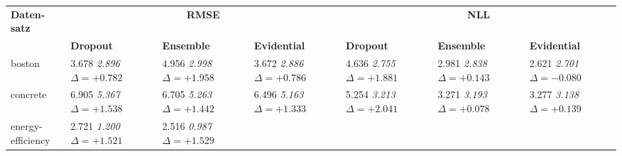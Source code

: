\begin{otherlanguage}{ngerman}
\begin{table*}[!htbp]
\centering
\scriptsize
\begin{tabularx}{\textwidth}{|l|X|X|X|X|X|X|}
\hline
\multirow{}{}{\textbf{Datensatz}} 
& \multicolumn{3}{c|}{\textbf{RMSE}} 
& \multicolumn{3}{c|}{\textbf{NLL}} \\ \cline{2-7}
& \textbf{Dropout} & \textbf{Ensemble} & \textbf{Evidential} 
& \textbf{Dropout} & \textbf{Ensemble} & \textbf{Evidential} \\ \hline
boston 
& 3.678 \newline \textit{2.896} \newline \mbox{$\Delta=+0.782$} 
& 4.956 \newline \textit{2.998} \newline \mbox{$\Delta=+1.958$} 
& 3.672 \newline \textit{2.886} \newline \mbox{$\Delta=+0.786$} 
& 4.636 \newline \textit{2.755} \newline \mbox{$\Delta=+1.881$} 
& 2.981 \newline \textit{2.838} \newline \mbox{$\Delta=+0.143$} 
& 2.621 \newline \textit{2.701} \newline \mbox{$\Delta=-0.080$} \\ \hline
concrete 
& 6.905 \newline \textit{5.367} \newline \mbox{$\Delta=+1.538$} 
& 6.705 \newline \textit{5.263} \newline \mbox{$\Delta=+1.442$} 
& 6.496 \newline \textit{5.163} \newline \mbox{$\Delta=+1.333$} 
& 5.254 \newline \textit{3.213} \newline \mbox{$\Delta=+2.041$} 
& 3.271 \newline \textit{3.193} \newline \mbox{$\Delta=+0.078$} 
& 3.277 \newline \textit{3.138} \newline \mbox{$\Delta=+0.139$} \\ \hline
energy-efficiency 
& 2.721 \newline \textit{1.200} \newline \mbox{$\Delta=+1.521$} 
& 2.516 \newline \textit{0.987} \newline \mbox{$\Delta=+1.529$} 

\end{tabularx}
\end{table*}
\end{otherlanguage}
